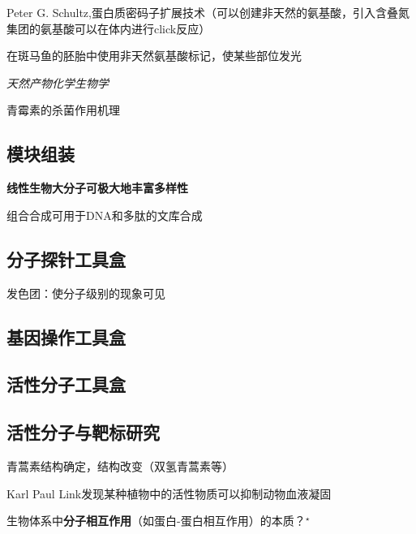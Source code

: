 Peter G. Schultz,蛋白质密码子扩展技术（可以创建非天然的氨基酸，引入含叠氮集团的氨基酸可以在体内进行click反应）
\begin{eg}
    在斑马鱼的胚胎中使用非天然氨基酸标记，使某些部位发光
\end{eg}
\textit{天然产物化学生物学}
\begin{eg}
    青霉素的杀菌作用机理
\end{eg}
\subsection{模块组装}%
\label{sub:模块组装}
\textbf{线性生物大分子可极大地丰富多样性}
\begin{eg}
    组合合成可用于DNA和多肽的文库合成
\end{eg}
\subsection{分子探针工具盒}%
\label{sub:分子探针工具盒}
\begin{eg}
    发色团：使分子级别的现象可见
\end{eg}
\subsection{基因操作工具盒}%
\label{sub:基因操作工具盒}
\subsection{活性分子工具盒}%
\label{sub:活性分子工具盒}
\subsection{活性分子与靶标研究}%
\label{sub:活性分子与靶标研究}
\begin{eg}
    青蒿素结构确定，结构改变（双氢青蒿素等）
\end{eg}
\begin{eg}
    Karl Paul Link发现某种植物中的活性物质可以抑制动物血液凝固
\end{eg}
\begin{question}
    生物体系中\textbf{分子相互作用}（如蛋白-蛋白相互作用）的本质？$^\star$
\end{question}
